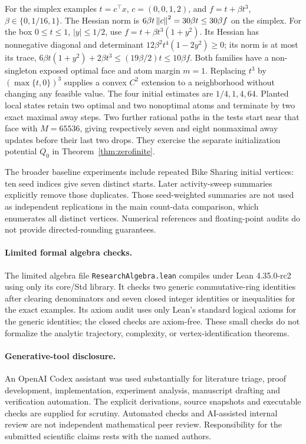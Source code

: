 For the simplex examples $t=c^\top x$, $c=(0,0,1,2)$, and
$f=t+\beta t^3$, $\beta\in\{0,1/16,1\}$. The Hessian norm is
$6\beta t\left\|c\right\|^2=30\beta t\le30\beta f$ on the simplex.
For the box $0\le t\le1$, $|y|\le1/2$, use
$f=t+\beta t^3(1+y^2)$. Its Hessian has nonnegative diagonal and
determinant $12\beta^2t^4(1-2y^2)\ge0$; its norm is at most its
trace, $6\beta t(1+y^2)+2\beta t^3\le(19\beta/2)t\le10\beta f$.
Both families have a non-singleton exposed optimal face and atom
margin $m=1$. Replacing $t^3$ by $(\max\{t,0\})^3$ supplies a
convex $C^2$ extension to a neighborhood without changing any feasible
value. The four initial estimates are $1/4,1,4,64$. Planted local
states retain two optimal and two nonoptimal atoms and terminate by
two exact maximal away steps.
Two further rational paths in the tests start near that face with
$M=65536$, giving respectively seven and eight nonmaximal away
updates before their last two drops. They exercise the separate
initialization potential $Q_0$ in Theorem~\ref{thm:zerofinite}.

The broader baseline experiments include repeated Bike Sharing initial
vertices: ten seed indices give seven distinct starts. Later
activity-sweep summaries explicitly remove those duplicates. Those
seed-weighted summaries are not used as independent
replications in the main count-data comparison, which enumerates all
distinct vertices. Numerical references and floating-point audits
do not provide directed-rounding guarantees.

\paragraph{Limited formal algebra checks.}
The limited algebra file \texttt{ResearchAlgebra.lean} compiles under
Lean 4.35.0-rc2 using only its core/Std library. It checks two generic
commutative-ring identities after clearing denominators and seven closed
integer identities or inequalities for the exact examples. Its axiom
audit uses only Lean's standard logical axioms for the generic identities;
the closed checks are axiom-free. These small checks do not formalize
the analytic trajectory, complexity, or vertex-identification theorems.

\paragraph{Generative-tool disclosure.}
An OpenAI Codex assistant was used substantially for literature triage,
proof development, implementation, experiment analysis, manuscript
drafting and verification automation. The explicit derivations, source
snapshots and executable checks are supplied for scrutiny. Automated
checks and AI-assisted internal review are not independent mathematical
peer review. Responsibility for the submitted scientific claims rests
with the named authors.


